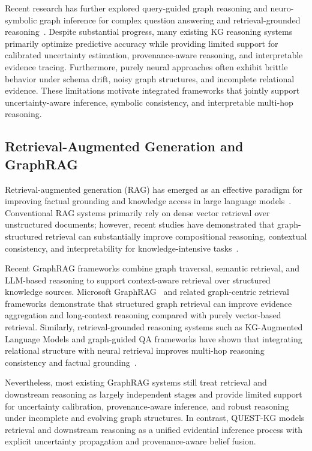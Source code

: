 \documentclass[sigconf,review,anonymous]{acmart}
\begin{document}
Recent research has further explored query-guided graph reasoning and neuro-symbolic graph inference for complex question answering and retrieval-grounded reasoning~\cite{yao2021kagnn}. Despite substantial progress, many existing KG reasoning systems primarily optimize predictive accuracy while providing limited support for calibrated uncertainty estimation, provenance-aware reasoning, and interpretable evidence tracing. Furthermore, purely neural approaches often exhibit brittle behavior under schema drift, noisy graph structures, and incomplete relational evidence. These limitations motivate integrated frameworks that jointly support uncertainty-aware inference, symbolic consistency, and interpretable multi-hop reasoning.

\subsection{Retrieval-Augmented Generation and GraphRAG}

Retrieval-augmented generation (RAG) has emerged as an effective paradigm for improving factual grounding and knowledge access in large language models~\cite{lewis2020retrieval}. Conventional RAG systems primarily rely on dense vector retrieval over unstructured documents; however, recent studies have demonstrated that graph-structured retrieval can substantially improve compositional reasoning, contextual consistency, and interpretability for knowledge-intensive tasks~\cite{pan2024graphrag}. 

Recent GraphRAG frameworks combine graph traversal, semantic retrieval, and LLM-based reasoning to support context-aware retrieval over structured knowledge sources. Microsoft GraphRAG~\cite{edge2024graphrag} and related graph-centric retrieval frameworks demonstrate that structured graph retrieval can improve evidence aggregation and long-context reasoning compared with purely vector-based retrieval. Similarly, retrieval-grounded reasoning systems such as KG-Augmented Language Models and graph-guided QA frameworks have shown that integrating relational structure with neural retrieval improves multi-hop reasoning consistency and factual grounding~\cite{yao2021kagnn}. 

Nevertheless, most existing GraphRAG systems still treat retrieval and downstream reasoning as largely independent stages and provide limited support for uncertainty calibration, provenance-aware inference, and robust reasoning under incomplete and evolving graph structures. In contrast, QUEST-KG models retrieval and downstream reasoning as a unified evidential inference process with explicit uncertainty propagation and provenance-aware belief fusion.
\end{document}
